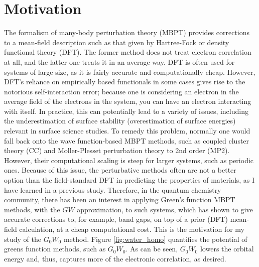 \documentclass[12pt]{caltech_thesis}
\begin{document}
\chapter{Motivation}
The formalism of many-body perturbation theory (MBPT) provides corrections to a mean-field description such as that given by Hartree-Fock or density functional theory (DFT). The former method does not treat electron correlation at all, and the latter one treats it in an average way. DFT is often used for systems of large size, as it is fairly accurate and computationally cheap. However, DFT's reliance on empirically based functionals in some cases gives rise to the notorious self-interaction error; because one is considering an electron in the average field of the electrons in the system, you can have an electron interacting with itself. In practice, this can potentially lead to a variety of issues, including the underestimation of surface stability (overestimation of surface energies) relevant in surface science studies. \autocite{schimka_accurate_2010} To remedy this problem, normally one would fall back onto the wave function-based MBPT methods, such as coupled cluster theory (CC) and Moller-Plesset perturbation theory to 2nd order (MP2). However, their computational scaling is steep for larger systems, such as periodic ones.\autocite{mcclain_gaussian-based_2017} Because of this issue, the perturbative methods often are not a better option than the field-standard DFT in predicting the properties of materials, as I have learned in a previous study.\autocite{kozlowski_elucidating_2021} Therefore, in the quantum chemistry community, there has been an interest in applying Green's function MBPT methods, with the $GW$ approximation, to such systems, which has shown to give accurate corrections to, for example, band gaps, on top of a prior (DFT) mean-field calculation, at a cheap computational cost.\autocite{noauthor_frontiers_nodate} This is the motivation for my study of the $G_0W_0$ method.
\newpage
Figure \ref{fig:water_homo} quantifies the potential of greens function methods, such as $G_0W_0$. As can be seen, $G_0W_0$ lowers the orbital energy and, thus, captures more of the electronic correlation, as desired.
\end{document}
